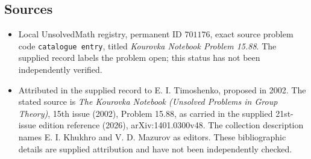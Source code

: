 \documentclass[11pt]{article}
\begin{document}
\subsection{Sources}
\begin{itemize}
\item Local UnsolvedMath registry, permanent ID \(701176\), exact source problem code \texttt{catalogue entry}, titled \emph{Kourovka Notebook Problem 15.88}. The supplied record labels the problem open; this status has not been independently verified.
\item Attributed in the supplied record to E. I. Timoshenko, proposed in 2002. The stated source is \emph{The Kourovka Notebook (Unsolved Problems in Group Theory)}, 15th issue (2002), Problem 15.88, as carried in the supplied 21st-issue edition reference (2026), arXiv:1401.0300v48. The collection description names E. I. Khukhro and V. D. Mazurov as editors. These bibliographic details are supplied attribution and have not been independently checked.
\end{itemize}
\end{document}
